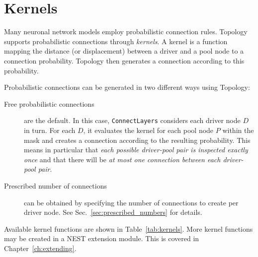 \documentclass[a4paper,12pt]{report}
\begin{document}
\section{Kernels}\label{sec:conn_kernels}

Many neuronal network models employ probabilistic connection
rules. Topology supports
probabilistic connections through \emph{kernels}. A
kernel is a function mapping the distance (or displacement) between a
driver and a pool node to a connection probability. Topology then
generates a connection according to this probability.

Probabilistic connections can be generated in two different ways using
Topology:
\begin{description}
\item[Free probabilistic connections] are the default.
  In this case, \lstinline!ConnectLayers! considers each driver node $D$
  in turn. For each $D$, it evaluates the kernel for each
  pool node $P$ within the mask and creates a connection according to
  the resulting probability. This means in particular that \emph{each
    possible driver-pool pair is inspected exactly once} and that
  there will be \emph{at most one connection between each driver-pool pair}.
\item[Prescribed number of connections] can be obtained by specifying
  the number of connections to create per driver node. See
  Sec.~\ref{sec:prescribed_numbers} for details.
\end{description}

Available kernel functions are shown in Table~\ref{tab:kernels}. More
kernel functions may be created in a NEST extension module. This is covered
in Chapter~\ref{ch:extending}.
\end{document}
